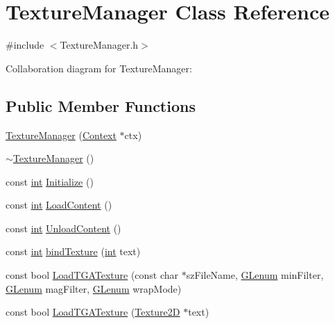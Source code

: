 \hypertarget{class_texture_manager}{\section{Texture\-Manager Class Reference}
\label{class_texture_manager}
}


{\ttfamily \#include $<$Texture\-Manager.\-h$>$}



Collaboration diagram for Texture\-Manager\-:
\subsection*{Public Member Functions}
\begin{DoxyCompactItemize}
\item 
\hyperlink{class_texture_manager_a3fdfac75701c2fae1cd7de289467c836}{Texture\-Manager} (\hyperlink{class_context}{Context} $\ast$ctx)
\item 
\hyperlink{class_texture_manager_a001d6d74674961db79987e3222682576}{$\sim$\-Texture\-Manager} ()
\item 
const \hyperlink{_s_d_l__thread_8h_a6a64f9be4433e4de6e2f2f548cf3c08e}{int} \hyperlink{class_texture_manager_ad7cb06e0fbae6bd29d2b84b935522879}{Initialize} ()
\item 
const \hyperlink{_s_d_l__thread_8h_a6a64f9be4433e4de6e2f2f548cf3c08e}{int} \hyperlink{class_texture_manager_a40102729eb09354100deac642a413e60}{Load\-Content} ()
\item 
const \hyperlink{_s_d_l__thread_8h_a6a64f9be4433e4de6e2f2f548cf3c08e}{int} \hyperlink{class_texture_manager_a2de373eb9fcf4ff670809a224a546f2d}{Unload\-Content} ()
\item 
const \hyperlink{_s_d_l__thread_8h_a6a64f9be4433e4de6e2f2f548cf3c08e}{int} \hyperlink{class_texture_manager_a8180ec2c0512a3b18dc5b419e14f98c2}{bind\-Texture} (\hyperlink{_s_d_l__thread_8h_a6a64f9be4433e4de6e2f2f548cf3c08e}{int} text)
\item 
const bool \hyperlink{class_texture_manager_a9a8dd1ab24d8d7942ef4dda31d4be5c0}{Load\-T\-G\-A\-Texture} (const char $\ast$sz\-File\-Name, \hyperlink{_g_l_e_w_2glew_8h_a5d5233918a454ad3975c620a69ac5f0b}{G\-Lenum} min\-Filter, \hyperlink{_g_l_e_w_2glew_8h_a5d5233918a454ad3975c620a69ac5f0b}{G\-Lenum} mag\-Filter, \hyperlink{_g_l_e_w_2glew_8h_a5d5233918a454ad3975c620a69ac5f0b}{G\-Lenum} wrap\-Mode)
\item 
const bool \hyperlink{class_texture_manager_a142bf086f71ae97731f5edc7d10995d7}{Load\-T\-G\-A\-Texture} (\hyperlink{class_texture2_d}{Texture2\-D} $\ast$text)

\end{DoxyCompactItemize}
